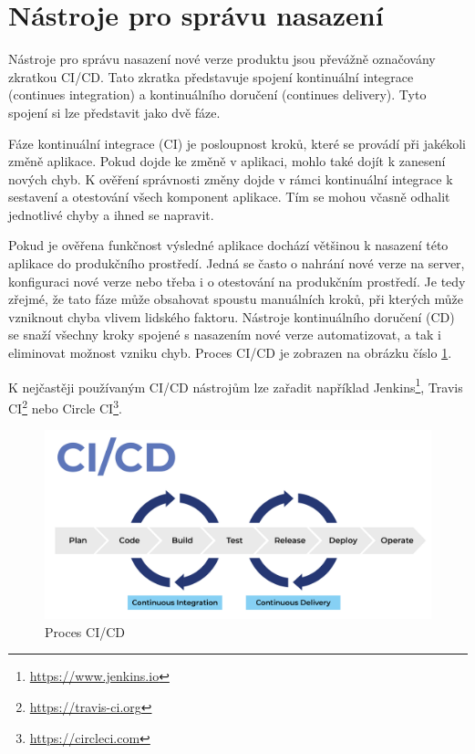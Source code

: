 \documentclass[czech,DP]{thesiskiv}
\begin{document}
\section{Nástroje pro správu nasazení}
Nástroje pro správu nasazení nové verze produktu jsou převážně označovány zkratkou CI/CD. Tato zkratka představuje spojení kontinuální integrace (continues integration) a kontinuálního doručení (continues delivery). Tyto spojení si lze představit jako dvě fáze.
\par
Fáze kontinuální integrace (CI) je posloupnost kroků, které se provádí při jakékoli změně aplikace. Pokud dojde ke změně v aplikaci, mohlo také dojít k zanesení nových chyb. K ověření správnosti změny dojde v rámci kontinuální integrace k sestavení a otestování všech komponent aplikace. Tím se mohou včasně odhalit jednotlivé chyby a ihned se napravit.
\par
Pokud je ověřena funkčnost výsledné aplikace dochází většinou k nasazení této aplikace do produkčního prostředí. Jedná se často o nahrání nové verze na server, konfiguraci nové verze nebo třeba i o otestování na produkčním prostředí. Je tedy zřejmé, že tato fáze může obsahovat spoustu manuálních kroků, při kterých může vzniknout chyba vlivem lidského faktoru. Nástroje kontinuálního doručení (CD) se snaží všechny kroky spojené s nasazením nové verze automatizovat, a tak i eliminovat možnost vzniku chyb. Proces CI/CD je zobrazen na obrázku číslo \ref{img:cicd}.
\par
K nejčastěji používaným CI/CD nástrojům lze zařadit například Jenkins\footnote{\url{https://www.jenkins.io}}, Travis CI\footnote{\url{https://travis-ci.org}} nebo Circle CI\footnote{\url{https://circleci.com}}. \cite{CICD}
\begin{figure}[!htb]
    \centering
    \includegraphics[width=\textwidth]{img/cicd.png}
    \caption{Proces CI/CD \cite{CICD}}
    \label{img:cicd}
\end{figure}
\FloatBarrier
\end{document}
